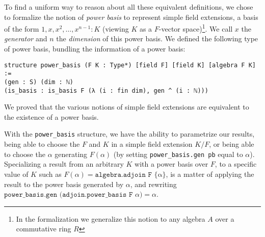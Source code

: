 \documentclass[a4paper,USenglish,cleveref, autoref, thm-restate]{lipics-v2021}
\newcommand{\lean}[1]{\texttt{#1}\xspace} %
\newcommand{\Q}{\mathbb{Q}}
\begin{document}

To find a uniform way to reason about all these equivalent definitions,
we chose to formalize the notion of \emph{power basis} to represent simple field extensions, a basis of the form $1, x, x^2, \dots, x^{n-1} : K$ (viewing $K$ as a $F$-vector space)\footnote{In the formalization we generalize this notion to any algebra $A$ over a commutative ring $R$}.
We call $x$ the \emph{generator} and $n$ the \emph{dimension} of this power basis.
We defined the following type of power basis, bundling the information of a power basis:
\begin{lstlisting}
structure power_basis (F K : Type*) [field F] [field K] [algebra F K] :=
(gen : S) (dim : ℕ)
(is_basis : is_basis F (λ (i : fin dim), gen ^ (i : ℕ)))
\end{lstlisting}
We proved that the various notions of simple field extensions are equivalent to the existence of a power basis.


With the \lean{power\_basis} structure, we have the ability to parametrize our results,
being able to choose the $F$ and $K$ in a simple field extension $K / F$, or being able to choose the $\alpha$ generating $F(\alpha)$ (by setting \lean{power\_basis.gen\ pb} equal to $\alpha$). Specializing a result from an arbitrary $K$ with a power basis over $F$,
to a specific value of $K$ such as $F(\alpha) = \lean{algebra.adjoin F \{α\}}$, is a matter of applying the result to the power basis generated by $\alpha$, and rewriting $\lean{power\_basis.gen (adjoin.power\_basis F $\alpha$)} = \alpha$.
\end{document}
